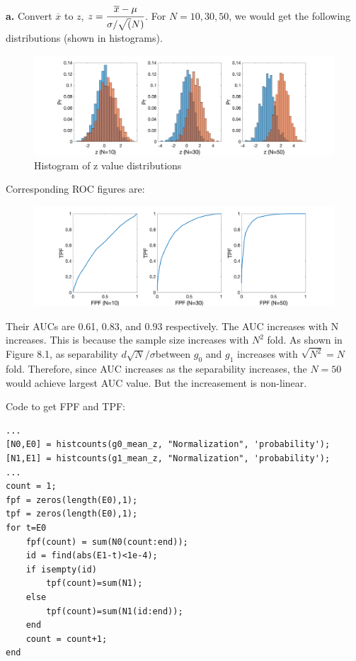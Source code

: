 \documentclass[12pt,a4paper]{article}
\begin{document}
\newpage
{}
\textbf{a.} Convert $\overline x$ to $z$, $z=\cfrac{\overline x-\mu}{\sigma / \sqrt(N)}$. For $N=10,30,50$, we would get the following distributions (shown in histograms).
\begin{figure}[!ht]
    \centering
    \includegraphics*[width=\textwidth]{hw_8_3_dist.png}
    \caption{Histogram of z value distributions}
\end{figure} 

Corresponding ROC figures are:
\begin{figure}[!ht]
    \centering
    \includegraphics*[width=\textwidth]{hw_8_3_roc.png}
\end{figure}

Their AUCs are 0.61, 0.83, and 0.93 respectively. The AUC increases with N increases. This is because the sample size increases with $N^2$ fold. As shown in Figure 8.1, as separability $d\sqrt{N}/\sigma$between $g_0$ and $g_1$ increases with $\sqrt{N^2}=N$ fold. Therefore, since AUC increases as the separability increases, the $N=50$ would achieve largest AUC value. But the increasement is non-linear. 

Code to get FPF and TPF:
\begin{lstlisting}
...
[N0,E0] = histcounts(g0_mean_z, "Normalization", 'probability');
[N1,E1] = histcounts(g1_mean_z, "Normalization", 'probability');
...
count = 1;
fpf = zeros(length(E0),1);
tpf = zeros(length(E0),1);
for t=E0
    fpf(count) = sum(N0(count:end));
    id = find(abs(E1-t)<1e-4);
    if isempty(id) 
        tpf(count)=sum(N1);
    else
        tpf(count)=sum(N1(id:end));
    end
    count = count+1;
end
\end{lstlisting}
\end{document}
